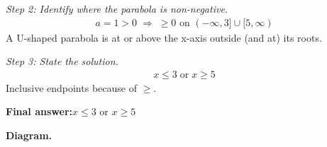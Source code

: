 \documentclass[11pt]{article}
\begin{document}
\textit{Step 2: Identify where the parabola is non-negative.}
\[\begin{gathered}
a = 1 > 0 \;\Longrightarrow\; \geq 0 \text{ on } (-\infty, 3] \cup [5, \infty)
\end{gathered}\]
A U-shaped parabola is at or above the x-axis outside (and at) its roots.

\textit{Step 3: State the solution.}
\[\begin{gathered}
x \leq 3 \;\text{or}\; x \geq 5
\end{gathered}\]
Inclusive endpoints because of \( \geq \).

\begin{answerbox}
\textbf{Final answer:}\quad \(\displaystyle x \leq 3\) or \(\displaystyle x \geq 5\)
\end{answerbox}
\textbf{Diagram.}
\end{document}
